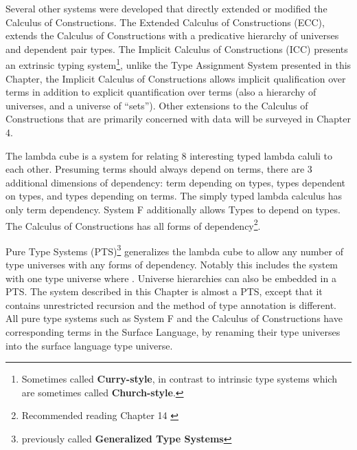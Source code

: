 Several other systems were developed that directly extended or modified the Calculus of Constructions.
The Extended Calculus of Constructions (\ac{ECC})\cite{luo1990extended,luo1994computation}, extends the Calculus of Constructions with a predicative hierarchy of universes and dependent pair types.
The Implicit Calculus of Constructions (\ac{ICC})\cite{10.1007/3-540-45413-6_27,10.1007/978-3-540-78499-9_26} presents an extrinsic typing system\footnote{
  Sometimes called \textbf{Curry-style}, in contrast to intrinsic type systems which are sometimes called \textbf{Church-style}.
  }, unlike the Type Assignment System presented in this Chapter, the Implicit Calculus of Constructions allows implicit qualification over terms in addition to explicit quantification over terms (also a hierarchy of universes, and a universe of ``sets'').
Other extensions to the Calculus of Constructions that are primarily concerned with data will be surveyed in Chapter 4.

The lambda cube is a system for relating 8 interesting typed lambda caluli to each other.
Presuming terms should always depend on terms, there are 3 additional dimensions of dependency: term depending on types, types dependent on types, and types depending on terms.
The simply typed lambda calculus has only term dependency.
System F additionally allows Types to depend on types.
The Calculus of Constructions has all forms of dependency\footnote{Recommended reading Chapter 14 \cite{sorensen2006lectures}}.

Pure Type Systems (\ac{PTS})\footnote{previously called \textbf{Generalized Type Systems}} generalizes the lambda cube to allow any number of type universes with any forms of dependency.
Notably this includes the system with one type universe where \tit{}.
Universe hierarchies can also be embedded in a \ac{PTS}.
The system described in this Chapter is almost a \ac{PTS}, except that it contains unrestricted recursion and the method of type annotation is different.
All pure type systems such as System F and the Calculus of Constructions have corresponding terms in the Surface Language, by renaming their type universes into the surface language type universe.


